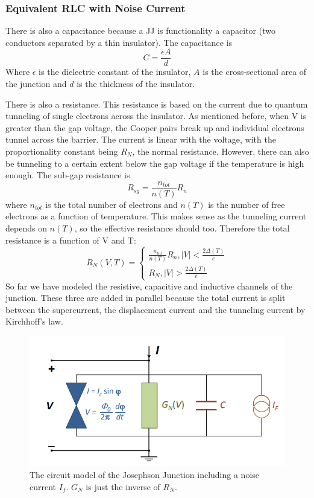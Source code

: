 \documentclass[conf]{new-aiaa}
\begin{document}
\subsubsection{Equivalent RLC with Noise Current}
There is also a capacitance because a JJ is functionality a capacitor (two conductors separated by a thin insulator). The capacitance is
$$C = \frac{\epsilon A}{d} $$
Where $\epsilon$ is the dielectric constant of the insulator, $A$ is the cross-sectional area of the junction and $d$ is the thickness of the insulator. \par
There is also a resistance. This resistance is based on the current due to quantum tunneling of single electrons across the insulator. As mentioned before, when V is greater than the gap voltage, the Cooper pairs break up and individual electrons tunnel across the barrier. The current is linear with the voltage, with the proportionality constant being $R_N$, the normal resistance. However, there can also be tunneling to a certain extent below the gap voltage if the temperature is high enough. The sub-gap resistance is 
$$ R_{sg} = \frac{n_{tot}}{n(T)}R_n$$
where $n_{tot}$ is the total number of electrons and $n(T)$ is the number of free electrons as a function of temperature. This makes sense as the tunneling current depends on $n(T)$, so the effective resistance should too. Therefore the total resistance is a function of V and T:
\[
    R_N(V,T) = \begin{cases}
    \frac{n_{tot}}{n(T)}R_n, |V| < \frac{2 \Delta(T)}{e}\\
    R_N, |V| > \frac{2 \Delta(T)}{e}
    \end{cases}
\]
So far we have modeled the resistive, capacitive and inductive channels of the junction. These three are added in parallel because the total current is split between the supercurrent, the displacement current and the tunneling current by Kirchhoff's law.\par

\begin{figure}[!ht]
    \centering
    \includegraphics[scale = 0.8]{junctionModel.PNG}
    \caption{The circuit model of the Josephson Junction including a noise current $I_f$. $G_N$ is just the inverse of $R_N$.}
    \label{fig:my_label}
\end{figure}
\end{document}
